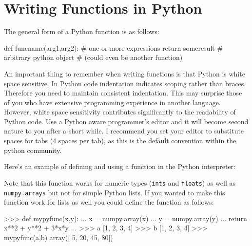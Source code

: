 

\section{Writing Functions in Python}

The general form of a Python function is as follows:
%
\begin{python}
def funcname(arg1,arg2):
    # one or more expressions
    return someresult # arbitrary python object 
                      # (could even be another function)
\end{python}
%
An important thing to remember when writing functions is that Python is
white space sensitive. In Python code indentation indicates scoping
rather than braces. Therefore you need to maintain consistent
indentation. This may surprise those of you who have extensive
programming experience in another language. However, white space
sensitivity contributes significantly to the readability of Python code.
Use a Python aware programmer's editor and it will become second nature
to you after a short while. I recommend you set your editor to
substitute spaces for tabs (4 spaces per tab), as this is the default
convention within the python community.

Here's an example of defining and using a function in the Python
interpreter:
%
%
Note that this function works for numeric types (\lstinline!ints! and
\lstinline!floats!) as well as \lstinline!numpy.arrays! but not for
simple Python lists. If you wanted to make this function work for lists
as well you could define the function as follows:
%
\begin{python}
>>> def mypyfunc(x,y):
...     x = numpy.array(x)
...     y = numpy.array(y)
...     return x**2 + y**2 + 3*x*y
... 
>>> a
[1, 2, 3, 4]
>>> b
[1, 2, 3, 4]
>>> mypyfunc(a,b)
array([ 5, 20, 45, 80])
\end{python}

